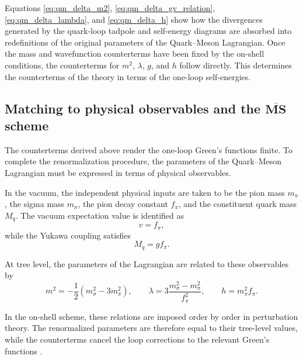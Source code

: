 Equations
\eqref{eq:qm_delta_m2},
\eqref{eq:qm_delta_gv_relation},
\eqref{eq:qm_delta_lambda}, and
\eqref{eq:qm_delta_h}
show how the divergences generated by the quark-loop tadpole and
self-energy diagrams are absorbed into redefinitions of the original
parameters of the Quark--Meson Lagrangian. Once the mass and
wavefunction counterterms have been fixed by the on-shell conditions,
the counterterms for \(m^2\), \(\lambda\), \(g\), and \(h\) follow
directly. This determines the counterterms of the theory in terms of the one-loop self-energies.

\subsection*{Matching to physical observables and the \texorpdfstring{$\overline{\mathbf{MS}}$}{MS-bar} scheme}

The counterterms derived above render the one-loop Green's
functions finite. To complete the renormalization procedure,
the parameters of the Quark--Meson Lagrangian must be expressed
in terms of physical observables.

In the vacuum, the independent physical inputs are taken to be
the pion mass $m_\pi$, the sigma mass $m_\sigma$, the pion decay
constant $f_\pi$, and the constituent quark mass $M_q$. The
vacuum expectation value is identified as
\begin{equation}
v = f_\pi,
\end{equation}
while the Yukawa coupling satisfies
\begin{equation}
M_q = g f_\pi.
\end{equation}

At tree level, the parameters of the Lagrangian are related to
these observables by
\begin{equation}
m^2 = -\frac{1}{2}(m_\sigma^2 - 3m_\pi^2), \qquad
\lambda = 3\frac{m_\sigma^2 - m_\pi^2}{f_\pi^2}, \qquad
h = m_\pi^2 f_\pi.
\end{equation}

In the on-shell scheme, these relations are imposed order by order
in perturbation theory. The renormalized parameters are therefore
equal to their tree-level values, while the counterterms cancel the
loop corrections to the relevant Green's functions
\cite{Folkestad2018}.

